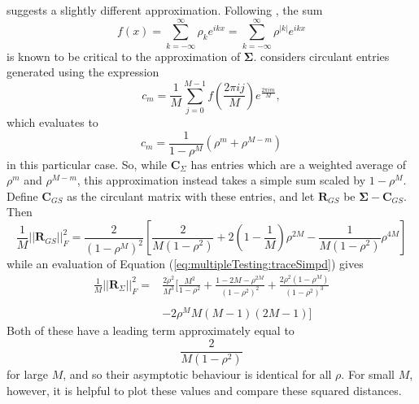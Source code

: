 \documentclass[letterpaper,12pt,oneside,final]{article}
\newcommand{\m}[1]{\mathbf{#1}}               %
\newcommand{\sm}[1]{\boldsymbol{#1}}   %
\newcommand{\norm}[1]{||{#1}||}              %
\newcommand{\frob}[1]{\norm{#1}_F}
\newcommand{\abs}[1]{\lvert{#1}\rvert}              %
\begin{document}
\cite{gray2006toeplitz} suggests a slightly different approximation. Following \cite{grenanderszego1958}, the sum
$$f(x) = \sum_{k = -\infty}^{\infty} \rho_k e^{ikx} = \sum_{k = -\infty}^{\infty} \rho^{\abs{k}} e^{ikx}$$
is known to be critical to the approximation of $\sm{\Sigma}$. \cite{gray2006toeplitz} considers circulant entries generated using the expression
$$c_m = \frac{1}{M} \sum_{j = 0}^{M-1} f\left ( \frac{2\pi i j}{M} \right ) e^{\frac{2 \pi i m}{M}},$$
which evaluates to
\begin{equation} \label{eq:multipleTesting:grayApprox}
  c_m  = \frac{1}{1 - \rho^M} \left ( \rho^m + \rho^{M-m} \right )
\end{equation}
in this particular case. So, while $\m{C}_{\Sigma}$ has entries which are a weighted average of $\rho^m$ and $\rho^{M-m}$, this approximation instead takes a simple sum scaled by $1 - \rho^M$. Define $\m{C}_{GS}$ as the circulant matrix with these entries, and let $\m{R}_{GS}$ be $\sm{\Sigma} - \m{C}_{GS}$. Then
\begin{equation} \label{eq:multipleTesting:rateEqgren}
    \frac{1}{M} \frob{\m{R}_{GS}}^2 = \frac{2}{(1 - \rho^M)^2} \left [ \frac{2}{M(1 - \rho^2)} + 2 \left ( 1 - \frac{1}{M} \right ) \rho^{2M} - \frac{1}{M(1 - \rho^2)} \rho^{4M} \right ]
\end{equation}
while an evaluation of Equation (\ref{eq:multipleTesting:traceSimpd}) gives
\begin{equation} \label{eq:multipleTesting:rateEqCsig}
  \begin{aligned}
    \frac{1}{M} \frob{\m{R}_{\Sigma}}^2 = & \frac{2 \rho^2}{M^3} \bigg [ \frac{M^2}{1 - \rho^2} + \frac{1 - 2M - \rho^{2M}}{(1 - \rho^2)^2} + \frac{2 \rho^2 ( 1 - \rho^M )}{(1 - \rho^2)^3} \\
    & \\
    & - 2 \rho^M M(M-1)(2M-1) \bigg ]
  \end{aligned}
\end{equation}
Both of these have a leading term approximately equal to
$$ \frac{2}{M(1-\rho^2)}$$
for large $M$, and so their asymptotic behaviour is identical for all $\rho$. For small $M$, however, it is helpful to plot these values and compare these squared distances.



\cleardoublepage %

\renewcommand*{\bibname}{References} %

\end{document}
